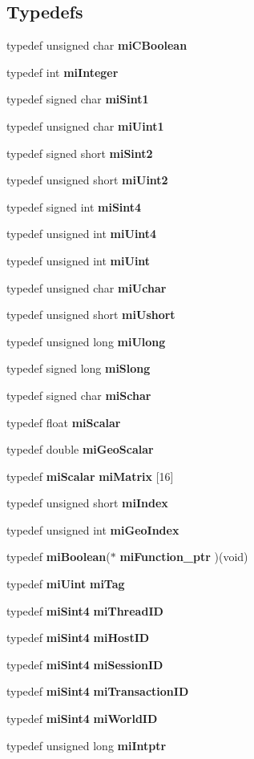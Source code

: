 \subsection*{Typedefs}
\begin{CompactItemize}
\item 
typedef unsigned char {\bf mi\-CBoolean}
\item 
typedef int {\bf mi\-Integer}
\item 
typedef signed char {\bf mi\-Sint1}
\item 
typedef unsigned char {\bf mi\-Uint1}
\item 
typedef signed short {\bf mi\-Sint2}
\item 
typedef unsigned short {\bf mi\-Uint2}
\item 
typedef signed int {\bf mi\-Sint4}
\item 
typedef unsigned int {\bf mi\-Uint4}
\item 
typedef unsigned int {\bf mi\-Uint}
\item 
typedef unsigned char {\bf mi\-Uchar}
\item 
typedef unsigned short {\bf mi\-Ushort}
\item 
typedef unsigned long {\bf mi\-Ulong}
\item 
typedef signed long {\bf mi\-Slong}
\item 
typedef signed char {\bf mi\-Schar}
\item 
typedef float {\bf mi\-Scalar}
\item 
typedef double {\bf mi\-Geo\-Scalar}
\item 
typedef {\bf mi\-Scalar} {\bf mi\-Matrix} [16]
\item 
typedef unsigned short {\bf mi\-Index}
\item 
typedef unsigned int {\bf mi\-Geo\-Index}
\item 
typedef {\bf mi\-Boolean}($\ast$ {\bf mi\-Function\_\-ptr} )(void)
\item 
typedef {\bf mi\-Uint} {\bf mi\-Tag}
\item 
typedef {\bf mi\-Sint4} {\bf mi\-Thread\-ID}
\item 
typedef {\bf mi\-Sint4} {\bf mi\-Host\-ID}
\item 
typedef {\bf mi\-Sint4} {\bf mi\-Session\-ID}
\item 
typedef {\bf mi\-Sint4} {\bf mi\-Transaction\-ID}
\item 
typedef {\bf mi\-Sint4} {\bf mi\-World\-ID}
\item 
typedef unsigned long {\bf mi\-Intptr}
\item 

\end{CompactItemize}
